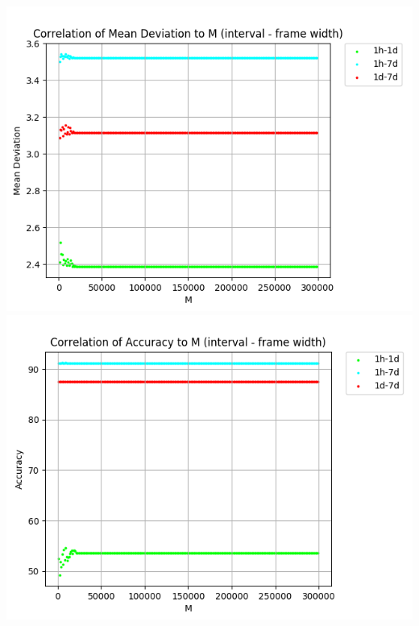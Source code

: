 \documentclass[a4paper,11pt,oneside]{article}
\begin{document}
   \begin{minipage}{\linewidth}
   	\includegraphics[width=0.57\linewidth]{./data/Tweets/ErrorVsTweetsN_1000to300000.png}
   	\includegraphics[width=0.53\linewidth]{./data/Tweets/AccuracyVsTweetsN_1000to300000.png}
   	\label{tweetsupto300000}
   \end{minipage}%
   \hfill
\end{document}
